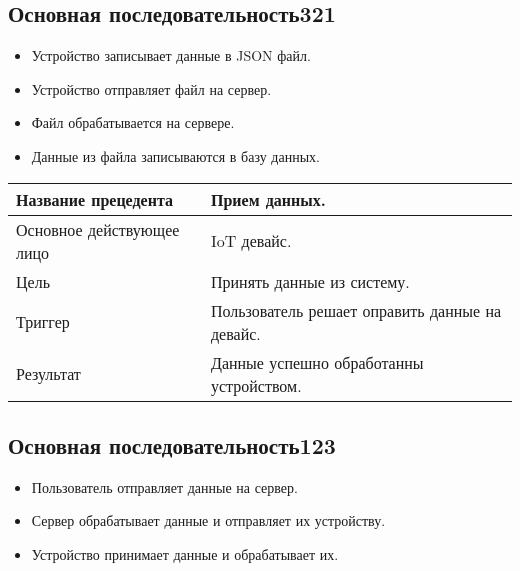 \subsection{Основная последовательность321}
\begin{itemize}
    \item Устройство записывает данные в JSON файл.
    \item Устройство отправляет файл на сервер.
    \item Файл обрабатывается на сервере.
    \item Данные из файла записываются в базу данных.
\end{itemize}
\begin{center}
    \begin{tabularx}{\textwidth}{|X|X|} \hline
    Название прецедента       & Прием данных.\\ \hline
    Основное действующее лицо & IoT девайс.\\ \hline
    Цель                      & Принять данные из систему.\\ \hline
    Триггер                   & Пользователь решает оправить данные на девайс.\\ \hline
    Результат                 & Данные успешно обработанны устройством.\\ \hline 
    \end{tabularx}
\end{center}
\subsection{Основная последовательность123}
\begin{itemize}
    \item Пользователь отправляет данные на сервер.
    \item Сервер обрабатывает данные и отправляет их устройству.
    \item Устройство принимает данные и обрабатывает их.
\end{itemize}


